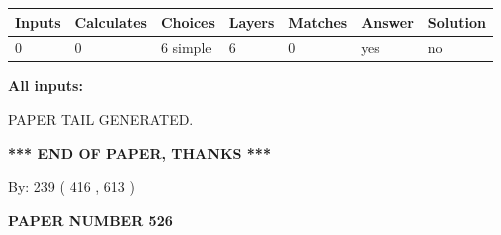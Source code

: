 \documentclass[12pt]{article}
\begin{document}
 
\noindent{}
 
 
   
   
   
   
\noindent\begin{tabular}{|l|l|l|l|l|l|l|}
 \hline
Inputs & Calculates & Choices & Layers & Matches & Answer & Solution \\ \hline
 0  & 
 0  & 
 6
  simple  
  & 
 6  & 
 0  & 
  yes & 
  no 
  \\ \hline
 \end{tabular}
   
   
   
   
\noindent{}
   
   
   
   
\noindent\vspace{0.1in}\hspace{-0.08in} {\textbf{\Large{All inputs: }}}
   
   
   
   
   
   
 \vspace{0.2in}
 
   
   
\vspace{2.0in} PAPER TAIL GENERATED.
   
   
   
   
\vspace{1.0in} 
{\textbf{\large{ *** END OF PAPER, THANKS *** }}} 
   
   
\hspace{1.0in} By: 
 239 ( 416 ,  613 )
   
   
   
   
\newpage 
\setcounter{page}{ 
   526001 } 
   
   
   
   
 {\textbf{ \Large{ PAPER NUMBER  526  }}}
   
   
\vspace{0.2in}
   
   
   
   
   
   
   
   
 \vspace{0.2in}
 
\end{document}
